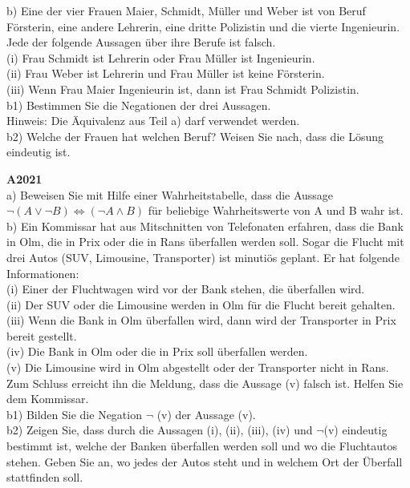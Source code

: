 \documentclass[landscape,twocolumn,a4paper]{article}
\begin{document}
b) Eine der vier Frauen Maier, Schmidt, Müller und Weber ist von Beruf Försterin, eine andere
Lehrerin, eine dritte Polizistin und die vierte Ingenieurin. Jede der folgende Aussagen über
ihre Berufe ist falsch. \\
(i) Frau Schmidt ist Lehrerin oder Frau Müller ist Ingenieurin. \\
(ii) Frau Weber ist Lehrerin und Frau Müller ist keine Försterin. \\
(iii) Wenn Frau Maier Ingenieurin ist, dann ist Frau Schmidt Polizistin. \\
b1) Bestimmen Sie die Negationen der drei Aussagen. \\
Hinweis: Die Äquivalenz aus Teil a) darf verwendet werden. \\
b2) Welche der Frauen hat welchen Beruf? Weisen Sie nach, dass die Lösung eindeutig ist.

\bigskip

\newpage

\textbf{A2021} \\

a) Beweisen Sie mit Hilfe einer Wahrheitstabelle, dass die Aussage $ \lnot(A \lor \lnot B) \Leftrightarrow (\lnot A \land  B)$ für beliebige Wahrheitswerte von A und B wahr ist. \\

b) Ein Kommissar hat aus Mitschnitten von Telefonaten erfahren, dass die Bank in Olm, die in
Prix oder die in Rans überfallen werden soll. Sogar die Flucht mit drei Autos (SUV, Limousine,
Transporter) ist minutiös geplant. Er hat folgende Informationen: \\
(i) Einer der Fluchtwagen wird vor der Bank stehen, die überfallen wird. \\
(ii) Der SUV oder die Limousine werden in Olm für die Flucht bereit gehalten. \\
(iii) Wenn die Bank in Olm überfallen wird, dann wird der Transporter in Prix bereit gestellt. \\
(iv) Die Bank in Olm oder die in Prix soll überfallen werden. \\
(v) Die Limousine wird in Olm abgestellt oder der Transporter nicht in Rans. \\
Zum Schluss erreicht ihn die Meldung, dass die Aussage (v) falsch ist. Helfen Sie dem Kommissar. \\
b1) Bilden Sie die Negation $\lnot$ (v)  der Aussage (v). \\
b2) Zeigen Sie, dass durch die Aussagen (i), (ii), (iii), (iv) und $\lnot$(v) eindeutig bestimmt ist,
welche der Banken überfallen werden soll und wo die Fluchtautos stehen. Geben Sie an,
wo jedes der Autos steht und in welchem Ort der Überfall stattfinden soll.
\end{document}
